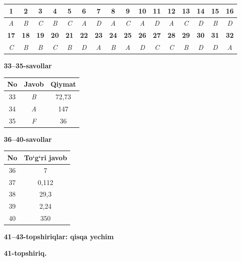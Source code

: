 \documentclass[11pt,a4paper]{article}
\begin{document}
\noindent\begin{tabular}{|c|c|c|c|c|c|c|c|c|c|c|c|c|c|c|c|}\hline
\textbf{1} & \textbf{2} & \textbf{3} & \textbf{4} & \textbf{5} & \textbf{6} & \textbf{7} & \textbf{8} & \textbf{9} & \textbf{10} & \textbf{11} & \textbf{12} & \textbf{13} & \textbf{14} & \textbf{15} & \textbf{16}\\\hline
\textsl{A} & \textsl{B} & \textsl{C} & \textsl{B} & \textsl{C} & \textsl{A} & \textsl{D} & \textsl{A} & \textsl{C} & \textsl{A} & \textsl{D} & \textsl{A} & \textsl{C} & \textsl{D} & \textsl{B} & \textsl{D}\\\hline
\textbf{17} & \textbf{18} & \textbf{19} & \textbf{20} & \textbf{21} & \textbf{22} & \textbf{23} & \textbf{24} & \textbf{25} & \textbf{26} & \textbf{27} & \textbf{28} & \textbf{29} & \textbf{30} & \textbf{31} & \textbf{32}\\\hline
\textsl{C} & \textsl{B} & \textsl{B} & \textsl{C} & \textsl{B} & \textsl{D} & \textsl{A} & \textsl{B} & \textsl{A} & \textsl{D} & \textsl{C} & \textsl{C} & \textsl{B} & \textsl{D} & \textsl{D} & \textsl{A}\\\hline
\end{tabular}\par\medskip
\noindent\textbf{33--35-savollar}\par\smallskip
\noindent\begin{tabular}{|c|c|c|}\hline \textbf{No} & \textbf{Javob} & \textbf{Qiymat}\\\hline
33 & \textsl{B} & 72,73\\\hline
34 & \textsl{A} & 147\\\hline
35 & \textsl{F} & 36\\\hline
\end{tabular}\par\medskip
\noindent\textbf{36--40-savollar}\par\smallskip
\noindent\begin{tabular}{|c|c|}\hline \textbf{No} & \textbf{To`g`ri javob}\\\hline
36 & 7\\\hline
37 & 0,112\\\hline
38 & 29,3\\\hline
39 & 2,24\\\hline
40 & 350\\\hline
\end{tabular}\par\medskip
\noindent\textbf{41--43-topshiriqlar: qisqa yechim}\par\smallskip
\noindent\textbf{41-topshiriq.}\par
\end{document}
